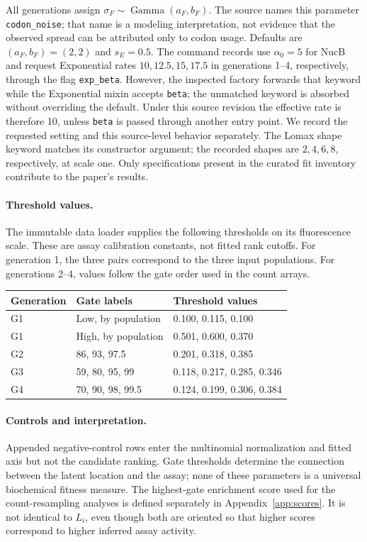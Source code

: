 All generations assign
$\sigma_F\sim\operatorname{Gamma}(a_F,b_F)$. The source names this
parameter \texttt{codon\_noise}; that name is a modeling interpretation,
not evidence that the observed spread can be attributed only to codon usage.
Defaults are $(a_F,b_F)=(2,2)$ and $s_E=0.5$. The command records use
$\alpha_0=5$ for NucB and request Exponential rates $10,12.5,15,17.5$ in
generations 1--4, respectively, through the flag \texttt{exp\_beta}.
However, the inspected factory forwards that keyword while the Exponential
mixin accepts \texttt{beta}; the unmatched keyword is absorbed without
overriding the default. Under this source revision the effective rate is
therefore 10, unless \texttt{beta} is passed through another entry point.
We record the requested setting and this source-level behavior separately.
The Lomax shape keyword matches its constructor argument; the recorded shapes
are $2,4,6,8$, respectively, at scale one.
Only specifications present in the curated fit inventory contribute to the
paper's results.

\paragraph{Threshold values.}
The immutable data loader supplies the following thresholds on its fluorescence
scale. These are assay calibration constants, not fitted rank cutoffs.
For generation 1, the three pairs correspond to the three input populations.
For generations 2--4, values follow the gate order used in the count arrays.
\begin{center}
\small
\begin{tabular}{lll}
\toprule
Generation & Gate labels & Threshold values \\
\midrule
G1 & Low, by population & 0.100, 0.115, 0.100 \\
G1 & High, by population & 0.501, 0.600, 0.370 \\
G2 & 86, 93, 97.5 & 0.201, 0.318, 0.385 \\
G3 & 59, 80, 95, 99 & 0.118, 0.217, 0.285, 0.346 \\
G4 & 70, 90, 98, 99.5 & 0.124, 0.199, 0.306, 0.384 \\
\bottomrule
\end{tabular}
\end{center}

\paragraph{Controls and interpretation.}
Appended negative-control rows enter the multinomial normalization and fitted
axis but not the candidate ranking. Gate thresholds determine the connection
between the latent location and the assay; none of these parameters is a
universal biochemical fitness measure. The highest-gate enrichment score used
for the count-resampling analyses is defined separately in
Appendix~\ref{app:scores}. It is not identical to $L_i$, even though both
are oriented so that higher scores correspond to higher inferred assay activity.

